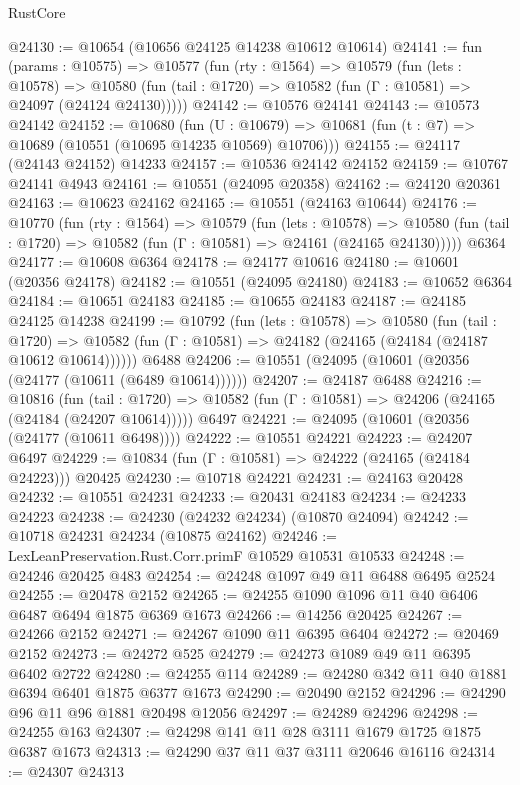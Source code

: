 \begin{lexlean}{RustCore}
\begin{coremodule}
@24130 := @10654 (@10656 @24125 @14238 @10612 @10614)
@24141 := fun (params : @10575) =>
  @10577
    (fun (rty : @1564) =>
    @10579
      (fun (lets : @10578) =>
      @10580 (fun (tail : @1720) => @10582 (fun (Γ : @10581) => @24097 (@24124 @24130)))))
@24142 := @10576 @24141
@24143 := @10573 @24142
@24152 := @10680
    (fun (U : @10679) => @10681 (fun (t : @7) => @10689 (@10551 (@10695 @14235 @10569) @10706)))
@24155 := @24117 (@24143 @24152) @14233
@24157 := @10536 @24142 @24152
@24159 := @10767 @24141 @4943
@24161 := @10551 (@24095 @20358)
@24162 := @24120 @20361
@24163 := @10623 @24162
@24165 := @10551 (@24163 @10644)
@24176 := @10770
    (fun (rty : @1564) =>
    @10579
      (fun (lets : @10578) =>
      @10580 (fun (tail : @1720) => @10582 (fun (Γ : @10581) => @24161 (@24165 @24130)))))
    @6364
@24177 := @10608 @6364
@24178 := @24177 @10616
@24180 := @10601 (@20356 @24178)
@24182 := @10551 (@24095 @24180)
@24183 := @10652 @6364
@24184 := @10651 @24183
@24185 := @10655 @24183
@24187 := @24185 @24125 @14238
@24199 := @10792
    (fun (lets : @10578) =>
    @10580
      (fun (tail : @1720) =>
      @10582 (fun (Γ : @10581) => @24182 (@24165 (@24184 (@24187 @10612 @10614))))))
    @6488
@24206 := @10551 (@24095 (@10601 (@20356 (@24177 (@10611 (@6489 @10614))))))
@24207 := @24187 @6488
@24216 := @10816
    (fun (tail : @1720) => @10582 (fun (Γ : @10581) => @24206 (@24165 (@24184 (@24207 @10614)))))
    @6497
@24221 := @24095 (@10601 (@20356 (@24177 (@10611 @6498))))
@24222 := @10551 @24221
@24223 := @24207 @6497
@24229 := @10834 (fun (Γ : @10581) => @24222 (@24165 (@24184 @24223))) @20425
@24230 := @10718 @24221
@24231 := @24163 @20428
@24232 := @10551 @24231
@24233 := @20431 @24183
@24234 := @24233 @24223
@24238 := @24230 (@24232 @24234) (@10870 @24094)
@24242 := @10718 @24231 @24234 (@10875 @24162)
@24246 := LexLeanPreservation.Rust.Corr.primF @10529 @10531 @10533
@24248 := @24246 @20425 @483
@24254 := @24248 @1097 @49 @11 @6488 @6495 @2524
@24255 := @20478 @2152
@24265 := @24255 @1090 @1096 @11 @40 @6406 @6487 @6494 @1875 @6369 @1673
@24266 := @14256 @20425
@24267 := @24266 @2152
@24271 := @24267 @1090 @11 @6395 @6404
@24272 := @20469 @2152
@24273 := @24272 @525
@24279 := @24273 @1089 @49 @11 @6395 @6402 @2722
@24280 := @24255 @114
@24289 := @24280 @342 @11 @40 @1881 @6394 @6401 @1875 @6377 @1673
@24290 := @20490 @2152
@24296 := @24290 @96 @11 @96 @1881 @20498 @12056
@24297 := @24289 @24296
@24298 := @24255 @163
@24307 := @24298 @141 @11 @28 @3111 @1679 @1725 @1875 @6387 @1673
@24313 := @24290 @37 @11 @37 @3111 @20646 @16116
@24314 := @24307 @24313

\end{coremodule}
\end{lexlean}
